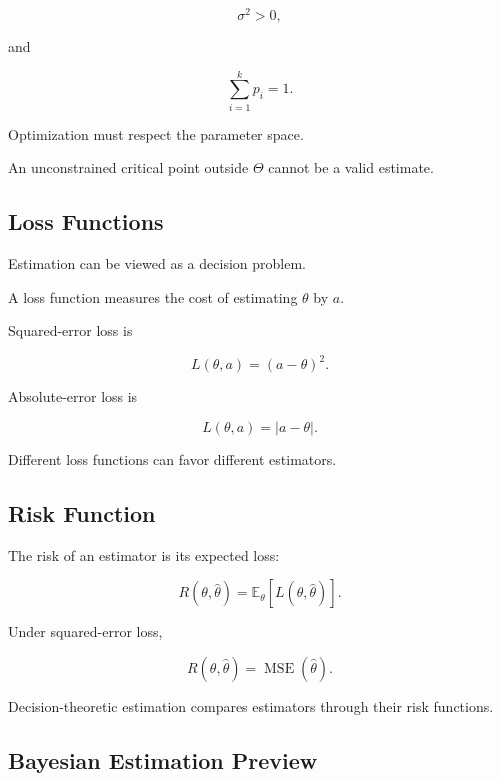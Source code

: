 \[
\boxed{
\sigma^2>0,
}
\]

and

\[
\boxed{
\sum_{i=1}^{k}p_i=1.
}
\]

Optimization must respect the parameter space.

An unconstrained critical point outside \(\Theta\) cannot be a valid
estimate.

\subsection{Loss Functions}
\label{subsec:loss-functions-estimation}

Estimation can be viewed as a decision problem.

A loss function measures the cost of estimating \(\theta\) by \(a\).

Squared-error loss is

\[
\boxed{
L(\theta,a)
=
(a-\theta)^2.
}
\]

Absolute-error loss is

\[
\boxed{
L(\theta,a)
=
|a-\theta|.
}
\]

Different loss functions can favor different estimators.

\subsection{Risk Function}
\label{subsec:risk-function}

The risk of an estimator is its expected loss:

\[
\boxed{
R(\theta,\widehat{\theta})
=
\mathbb{E}_\theta
[
L(\theta,\widehat{\theta})
].
}
\]

Under squared-error loss,

\[
\boxed{
R(\theta,\widehat{\theta})
=
\operatorname{MSE}(\widehat{\theta}).
}
\]

Decision-theoretic estimation compares estimators through their risk
functions.

\subsection{Bayesian Estimation Preview}
\label{subsec:bayesian-estimation-preview}

